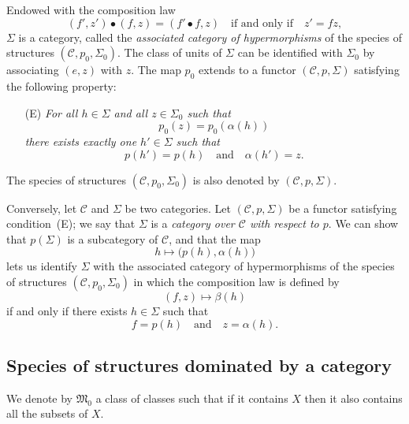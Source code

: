 \documentclass[a4paper,fleqn]{article}
\theoremstyle{plain}
\theoremstyle{definition}
\newcommand{\oldpage}[1]{{\marginpar{\footnotesize$\bigg\vert$\,\,\,\,\textit{p.~#1}}}}
\newcommand{\textand}{\quad\text{and}\quad}
\newcommand{\CC}{\mathcal{C}}
\newcommand{\MM}{\mathfrak{M}}
\begin{document}
Endowed with the composition law
\[
  (f',z')\bullet(f,z)
  = (f'\bullet f,z)
  \quad\text{if and only if}\quad
  z'=fz,
\]
\oldpage{352}
$\Sigma$ is a category, called the \emph{associated category of hypermorphisms} of the species of structures $(\CC,p_0,\Sigma_0)$.
The class of units of $\Sigma$ can be identified with $\Sigma_0$ by associating $(e,z)$ with $z$.
The map $p_0$ extends to a functor $(\CC,p,\Sigma)$ satisfying the following property:
\begin{enumerate}
  \item[\normalfont(E)] \itshape
    For all $h\in\Sigma$ and all $z\in\Sigma_0$ such that
    \[
      p_0(z)
      = p_0(\alpha(h))
    \]
    there exists exactly one $h'\in\Sigma$ such that
    \[
      p(h')=p(h)
      \textand
      \alpha(h')=z.
    \]
\end{enumerate}
The species of structures $(\CC,p_0,\Sigma_0)$ is also denoted by $(\CC,p,\Sigma)$.

Conversely, let $\CC$ and $\Sigma$ be two categories.
Let $(\CC,p,\Sigma)$ be a functor satisfying condition~(E);
we say that $\Sigma$ is a \emph{category over $\CC$ with respect to $p$}.
We can show \cite{3a} that $p(\Sigma)$ is a subcategory of $\CC$, and that the map
\[
  h\longmapsto \big(p(h),\alpha(h)\big)
\]
lets us identify $\Sigma$ with the associated category of hypermorphisms of the species of structures $(\CC,p_0,\Sigma_0)$ in which the composition law is defined by
\[
  (f,z) \longmapsto \beta(h)
\]
if and only if there exists $h\in\Sigma$ such that
\[
  f=p(h)
  \textand
  z=\alpha(h).
\]



\subsection{Species of structures dominated by a category}
\label{section:i.3}

We denote by $\MM_0$ a class of classes such that if it contains $X$ then it also contains all the subsets of $X$.
\end{document}
